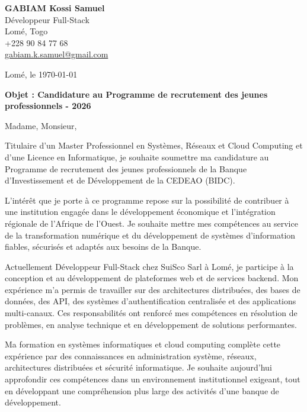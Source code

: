 \documentclass[11pt,a4paper]{article}
\begin{document}
\begin{flushleft}
    {\large\textbf{GABIAM Kossi Samuel}}\\
    Développeur Full-Stack\\
    Lomé, Togo\\
    +228 90 84 77 68\\
    \href{mailto:gabiam.k.samuel@gmail.com}{gabiam.k.samuel@gmail.com}
\end{flushleft}

\vspace{0.3cm}

\begin{flushright}
    Lomé, le \today
\end{flushright}

\vspace{0.2cm}

\textbf{Objet : Candidature au Programme de recrutement des jeunes
professionnels - 2026}

\vspace{0.2cm}

Madame, Monsieur,

Titulaire d'un Master Professionnel en Systèmes, Réseaux et Cloud Computing
et d'une Licence en Informatique, je souhaite soumettre ma candidature au
Programme de recrutement des jeunes professionnels de la Banque
d'Investissement et de Développement de la CEDEAO (BIDC).

L'intérêt que je porte à ce programme repose sur la possibilité de contribuer
à une institution engagée dans le développement économique et l'intégration
régionale de l'Afrique de l'Ouest. Je souhaite mettre mes compétences au
service de la transformation numérique et du développement de systèmes
d'information fiables, sécurisés et adaptés aux besoins de la Banque.

Actuellement Développeur Full-Stack chez SuiSco Sarl à Lomé, je participe à
la conception et au développement de plateformes web et de services
backend. Mon expérience m'a permis de travailler sur des architectures
distribuées, des bases de données, des API, des systèmes d'authentification
centralisée et des applications multi-canaux. Ces responsabilités ont
renforcé mes compétences en résolution de problèmes, en analyse technique
et en développement de solutions performantes.

Ma formation en systèmes informatiques et cloud computing complète cette
expérience par des connaissances en administration système, réseaux,
architectures distribuées et sécurité informatique. Je souhaite aujourd'hui
approfondir ces compétences dans un environnement institutionnel exigeant,
tout en développant une compréhension plus large des activités d'une banque
de développement.
\end{document}
